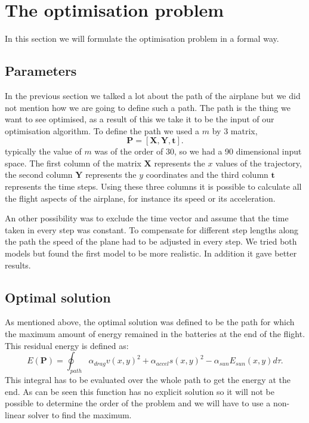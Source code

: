\section{The optimisation problem}

In this section we will formulate the optimisation problem in a formal way.
\subsection{Parameters}

In the previous section we talked a lot about the path of the airplane but we did not mention how we are going to define such a path.
The path is the thing we want to see optimised, as a result of this we take it to be the input of our optimisation algorithm.
To define the path we used a $m$ by 3 matrix, 
\begin{equation}
\mathbf{P} = \left[\mathbf{X},\mathbf{Y},\mathbf{t} \right] .
\end{equation}
typically the value of $ m $ was of the order of 30, so we had a 90 dimensional input space.
The first column of the matrix $ \mathbf{X} $ represents the $ x $ values of the trajectory, the second column $ \mathbf{Y} $ represents the $ y $ coordinates and the third column $ \mathbf{t}  $ represents the time steps.
Using these three columns it is possible to calculate all the flight aspects of the airplane, for instance its speed or its acceleration.

An other possibility was to exclude the time vector and assume that the time taken in every step was constant.
To compensate for different step lengths along the path  the  speed of the plane had to be adjusted in every step.
We tried both models but found the first model to be more realistic. In addition it gave  better results.

\subsection{Optimal solution}

As mentioned above, the optimal solution was defined to be the path for which the maximum amount of energy remained in the batteries at the end of the flight.
This residual  energy is defined as:
\begin{equation}
E(\mathbf{P}) = \oint_{path} \alpha_{drag}v(x,y)^2  + \alpha_{accel}  s(x,y)^2   -\alpha_{sun} E_{sun}(x,y)  d\tau.
\end{equation}
This integral has to be evaluated over the whole path to get the energy at the end.
As  can be seen this function has no explicit solution so it will not be possible to determine the order of the problem and we will have to use a non-linear solver to find the maximum.

